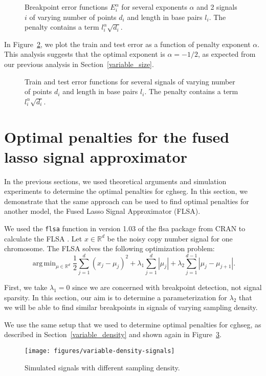 \documentclass{jsfds} %
\newcommand{\fig}[3][H]{
  \begin{figure}[#1]
    \hskip -1cm
    
    \caption{#3}
    \label{fig:#2}
  \end{figure}
}
\DeclareMathOperator*{\argmin}{arg\,min}
\newcommand{\RR}{\mathbb{R}}
\begin{document}
\fig{variable-size-berr}{Breakpoint error functions $E_i^\alpha$ for
  several exponents $\alpha$ and 2 signals $i$ of varying number of
  points $d_i$ and length in base pairs $l_i$. The penalty contains a
  term $l_i^\alpha\sqrt{d_i}$.}

In Figure~\ref{fig:variable-size-error-alpha}, we plot the train and
test error as a function of penalty exponent $\alpha$. This analysis
suggests that the optimal exponent is $\alpha=-1/2$, as expected from
our previous analysis in Section~\ref{variable_size}.

\fig{variable-size-error-alpha}{Train and test error functions for
  several signals of varying number of points $d_i$ and length in base
  pairs $l_i$. The penalty contains a term $l_i^\alpha \sqrt{d_i}$.}

\newpage
\section{Optimal penalties for the fused lasso signal approximator}

In the previous sections, we used theoretical arguments and simulation
experiments to determine the optimal penalties for cghseg. In this
section, we demonstrate that the same approach can be used to find
optimal penalties for another model, the Fused Lasso Signal
Approximator (FLSA).

We used the \verb|flsa| function in version 1.03 of the flsa
package from CRAN to calculate the FLSA \citep{fused-lasso-path}. Let
$x\in\RR^d$ be the noisy copy number signal for one chromosome. The
FLSA solves the following optimization problem:
\begin{equation}
  \label{eq:flsa}
\argmin_{\mu\in\RR^d} 
\frac 1 2 \sum_{j=1}^d (x_j-\mu_j)^2
+\lambda_1\sum_{j=1}^d|\mu_j|
+\lambda_2\sum_{j=1}^{d-1}|\mu_j-\mu_{j+1}|.
\end{equation}

First, we take $\lambda_1=0$ since we are concerned with breakpoint
detection, not signal sparsity. In this section, our aim is to
determine a parameterization for $\lambda_2$ that we will be able to
find similar breakpoints in signals of varying sampling density.

We use the same setup that we used to determine optimal penalties for
cghseg, as described in Section~\ref{variable_density} and shown again
in Figure~\ref{fig:variable-density-signals-flsa}.

\begin{figure}[h]
  \centering
  \texttt{[image: figures/variable-density-signals]}
  \caption{Simulated signals with different
  sampling density.}
  \label{fig:variable-density-signals-flsa}
\end{figure}
\end{document}
